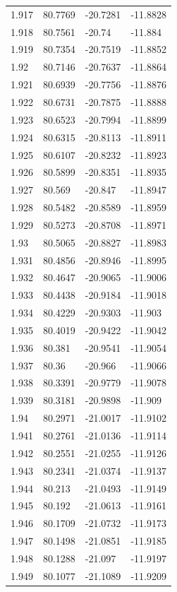 \begin{tabular}{llll}
1.917 & 80.7769 & -20.7281 & -11.8828 \\
1.918 & 80.7561 & -20.74 & -11.884 \\
1.919 & 80.7354 & -20.7519 & -11.8852 \\
1.92 & 80.7146 & -20.7637 & -11.8864 \\
1.921 & 80.6939 & -20.7756 & -11.8876 \\
1.922 & 80.6731 & -20.7875 & -11.8888 \\
1.923 & 80.6523 & -20.7994 & -11.8899 \\
1.924 & 80.6315 & -20.8113 & -11.8911 \\
1.925 & 80.6107 & -20.8232 & -11.8923 \\
1.926 & 80.5899 & -20.8351 & -11.8935 \\
1.927 & 80.569 & -20.847 & -11.8947 \\
1.928 & 80.5482 & -20.8589 & -11.8959 \\
1.929 & 80.5273 & -20.8708 & -11.8971 \\
1.93 & 80.5065 & -20.8827 & -11.8983 \\
1.931 & 80.4856 & -20.8946 & -11.8995 \\
1.932 & 80.4647 & -20.9065 & -11.9006 \\
1.933 & 80.4438 & -20.9184 & -11.9018 \\
1.934 & 80.4229 & -20.9303 & -11.903 \\
1.935 & 80.4019 & -20.9422 & -11.9042 \\
1.936 & 80.381 & -20.9541 & -11.9054 \\
1.937 & 80.36 & -20.966 & -11.9066 \\
1.938 & 80.3391 & -20.9779 & -11.9078 \\
1.939 & 80.3181 & -20.9898 & -11.909 \\
1.94 & 80.2971 & -21.0017 & -11.9102 \\
1.941 & 80.2761 & -21.0136 & -11.9114 \\
1.942 & 80.2551 & -21.0255 & -11.9126 \\
1.943 & 80.2341 & -21.0374 & -11.9137 \\
1.944 & 80.213 & -21.0493 & -11.9149 \\
1.945 & 80.192 & -21.0613 & -11.9161 \\
1.946 & 80.1709 & -21.0732 & -11.9173 \\
1.947 & 80.1498 & -21.0851 & -11.9185 \\
1.948 & 80.1288 & -21.097 & -11.9197 \\
1.949 & 80.1077 & -21.1089 & -11.9209 \\

\end{tabular}
